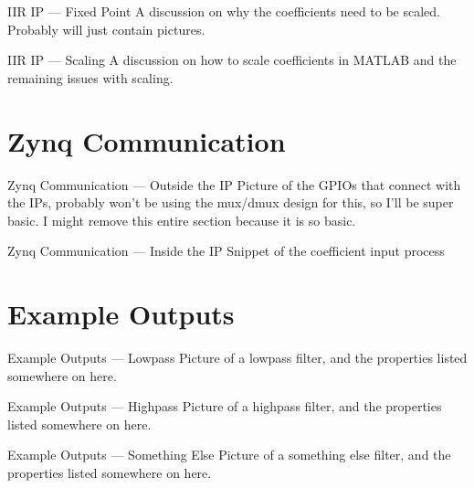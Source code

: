 \documentclass{beamer}
\begin{document}
\begin{frame}{IIR IP --- Fixed Point}
  A discussion on why the coefficients need to be scaled. Probably will just
  contain pictures.
\end{frame}
\begin{frame}{IIR IP --- Scaling}
  A discussion on how to scale coefficients in MATLAB and the remaining issues
  with scaling.
\end{frame}

\section{Zynq Communication}
\begin{frame}{Zynq Communication --- Outside the IP}
  Picture of the GPIOs that connect with the IPs, probably won't be using the
  mux/dmux design for this, so I'll be super basic. I might remove this entire
  section because it is so basic.
\end{frame}
\begin{frame}{Zynq Communication --- Inside the IP}
  Snippet of the coefficient input process
\end{frame}

\section{Example Outputs}
\begin{frame}{Example Outputs --- Lowpass}
  Picture of a lowpass filter, and the properties listed somewhere on here.
\end{frame}
\begin{frame}{Example Outputs --- Highpass}
  Picture of a highpass filter, and the properties listed somewhere on here.
\end{frame}
\begin{frame}{Example Outputs --- Something Else}
  Picture of a something else filter, and the properties listed somewhere on
  here.
\end{frame}
\end{document}
